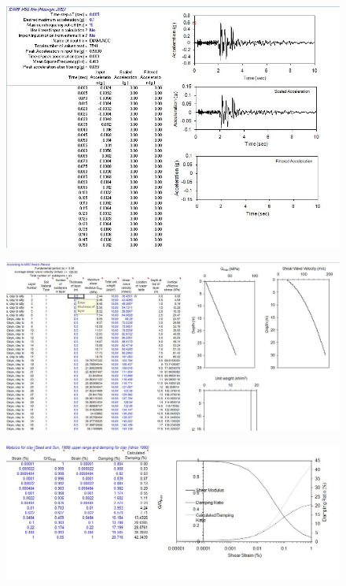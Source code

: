 \documentclass[11pt,a4paper]{report}
\begin{document}
\begin{figure}[h!]
	\centering
	\includegraphics[width=1.2\linewidth]{"NERA_RES"}
	\label{Ner1}
\end{figure} 

\begin{figure}[h!]
	\centering
	\includegraphics[width=1\linewidth]{"NERA_RES2"}
	\label{Ner2}
\end{figure}

\begin{figure}[h!]
	\centering
	\includegraphics[width=1\linewidth]{"NERA_RES3"}
	\label{Ner3}
\end{figure}
\end{document}
